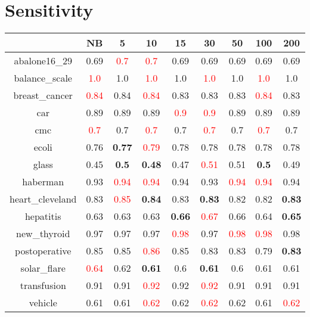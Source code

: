 \documentclass{article}%
\begin{document}
\section*{Sensitivity}%
\begin{tabular}{c|cccccccc}%
\hline%
&NB&5&10&15&30&50&100&200\\%
\hline%
abalone16\_29&0.69&\textcolor{red}{ 
0.7
}&\textcolor{red}{ 
0.7
}&0.69&0.69&0.69&0.69&0.69\\%
\hline%
balance\_scale&\textcolor{red}{ 
1.0
}&1.0&\textcolor{red}{ 
1.0
}&1.0&\textcolor{red}{ 
1.0
}&1.0&\textcolor{red}{ 
1.0
}&1.0\\%
\hline%
breast\_cancer&\textcolor{red}{ 
0.84
}&0.84&\textcolor{red}{ 
0.84
}&0.83&0.83&0.83&\textcolor{red}{ 
0.84
}&0.83\\%
\hline%
car&0.89&0.89&0.89&\textcolor{red}{ 
0.9
}&\textcolor{red}{ 
0.9
}&0.89&0.89&0.89\\%
\hline%
cmc&\textcolor{red}{ 
0.7
}&0.7&\textcolor{red}{ 
0.7
}&0.7&\textcolor{red}{ 
0.7
}&0.7&\textcolor{red}{ 
0.7
}&0.7\\%
\hline%
ecoli&0.76&\textbf{0.77}&\textcolor{red}{ 
0.79
}&0.78&0.78&0.78&0.78&0.78\\%
\hline%
glass&0.45&\textbf{0.5}&\textbf{0.48}&0.47&\textcolor{red}{ 
0.51
}&0.51&\textbf{0.5}&0.49\\%
\hline%
haberman&0.93&\textcolor{red}{ 
0.94
}&\textcolor{red}{ 
0.94
}&0.94&0.93&\textcolor{red}{ 
0.94
}&\textcolor{red}{ 
0.94
}&0.94\\%
\hline%
heart\_cleveland&0.83&\textcolor{red}{ 
0.85
}&\textbf{0.84}&0.83&\textbf{0.83}&0.82&0.82&\textbf{0.83}\\%
\hline%
hepatitis&0.63&0.63&0.63&\textbf{0.66}&\textcolor{red}{ 
0.67
}&0.66&0.64&\textbf{0.65}\\%
\hline%
new\_thyroid&0.97&0.97&0.97&\textcolor{red}{ 
0.98
}&0.97&\textcolor{red}{ 
0.98
}&\textcolor{red}{ 
0.98
}&0.98\\%
\hline%
postoperative&0.85&0.85&\textcolor{red}{ 
0.86
}&0.85&0.83&0.83&0.79&\textbf{0.83}\\%
\hline%
solar\_flare&\textcolor{red}{ 
0.64
}&0.62&\textbf{0.61}&0.6&\textbf{0.61}&0.6&0.61&0.61\\%
\hline%
transfusion&0.91&0.91&\textcolor{red}{ 
0.92
}&0.92&\textcolor{red}{ 
0.92
}&0.91&0.91&0.91\\%
\hline%
vehicle&0.61&0.61&\textcolor{red}{ 
0.62
}&0.62&\textcolor{red}{ 
0.62
}&0.62&0.61&\textcolor{red}{ 
0.62
}\\%
\hline%

\end{tabular}
\end{document}
